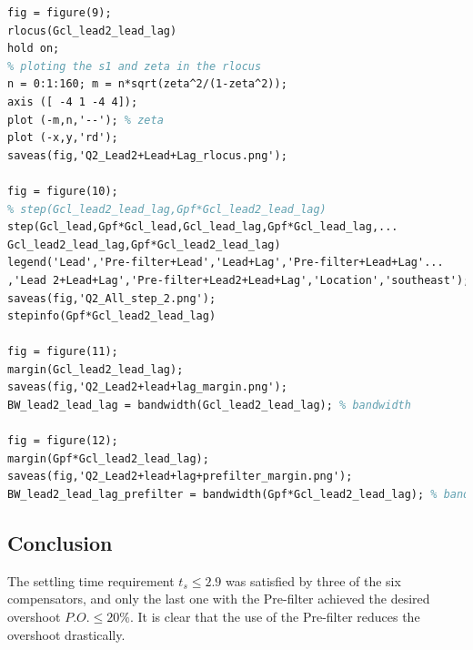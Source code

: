 \documentclass[11pt, a4paper]{article}
\begin{document}
\begin{lstlisting}[language=tex, caption={}, label={}]
%% Comparing the new compensator of the previous designs.
fig = figure(9);
rlocus(Gcl_lead2_lead_lag)
hold on;
% ploting the s1 and zeta in the rlocus
n = 0:1:160; m = n*sqrt(zeta^2/(1-zeta^2));
axis ([ -4 1 -4 4]);
plot (-m,n,'--'); % zeta
plot (-x,y,'rd');
saveas(fig,'Q2_Lead2+Lead+Lag_rlocus.png');

fig = figure(10);
% step(Gcl_lead2_lead_lag,Gpf*Gcl_lead2_lead_lag)
step(Gcl_lead,Gpf*Gcl_lead,Gcl_lead_lag,Gpf*Gcl_lead_lag,...
Gcl_lead2_lead_lag,Gpf*Gcl_lead2_lead_lag)
legend('Lead','Pre-filter+Lead','Lead+Lag','Pre-filter+Lead+Lag'...
,'Lead 2+Lead+Lag','Pre-filter+Lead2+Lead+Lag','Location','southeast');
saveas(fig,'Q2_All_step_2.png');
stepinfo(Gpf*Gcl_lead2_lead_lag)

fig = figure(11);
margin(Gcl_lead2_lead_lag);
saveas(fig,'Q2_Lead2+lead+lag_margin.png');
BW_lead2_lead_lag = bandwidth(Gcl_lead2_lead_lag); % bandwidth

fig = figure(12);
margin(Gpf*Gcl_lead2_lead_lag);
saveas(fig,'Q2_Lead2+lead+lag+prefilter_margin.png');
BW_lead2_lead_lag_prefilter = bandwidth(Gpf*Gcl_lead2_lead_lag); % bandwidth
\end{lstlisting}


\subsection{Conclusion}
The settling time requirement $t_s\leq2.9$ was satisfied by three of the six compensators, and only the last one with the Pre-filter achieved the desired overshoot $P.O.\leq 20 \%$. It is clear that the use of the Pre-filter reduces the overshoot drastically.  








\printbibliography
\end{document}
